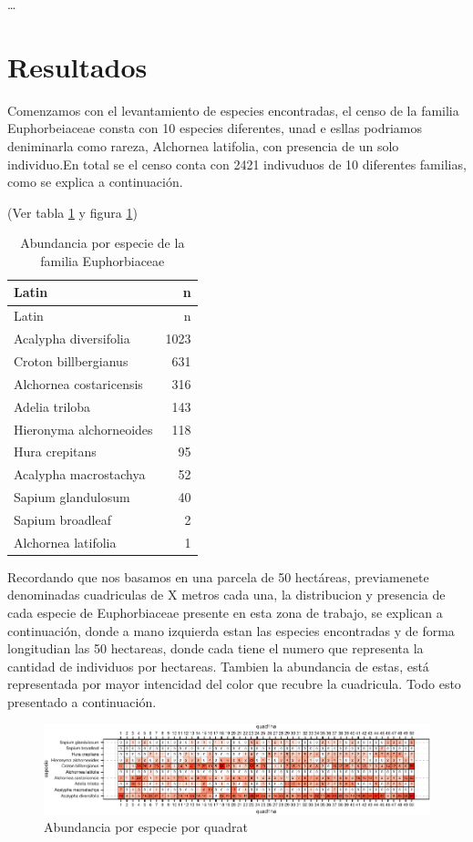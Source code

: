 \documentclass[11pt,]{article}
\begin{document}
\ldots

\section{Resultados}\label{resultados}

Comenzamos con el levantamiento de especies encontradas, el censo de la
familia Euphorbeiaceae consta con 10 especies diferentes, unad e esllas
podriamos deniminarla como rareza, Alchornea latifolia, con presencia de
un solo individuo.En total se el censo conta con 2421 indivuduos de 10
diferentes familias, como se explica a continuación.

(Ver tabla \ref{tab:tabla_de_abundancia} y figura \ref{fig:abun_sp_q})

\begin{longtable}[]{@{}lr@{}}
\caption{\label{tab:tabla_de_abundancia}Abundancia por especie de la
familia Euphorbiaceae}\tabularnewline
\toprule
Latin & n\tabularnewline
\midrule
\endfirsthead
\toprule
Latin & n\tabularnewline
\midrule
\endhead
Acalypha diversifolia & 1023\tabularnewline
Croton billbergianus & 631\tabularnewline
Alchornea costaricensis & 316\tabularnewline
Adelia triloba & 143\tabularnewline
Hieronyma alchorneoides & 118\tabularnewline
Hura crepitans & 95\tabularnewline
Acalypha macrostachya & 52\tabularnewline
Sapium glandulosum & 40\tabularnewline
Sapium broadleaf & 2\tabularnewline
Alchornea latifolia & 1\tabularnewline
\bottomrule
\end{longtable}

Recordando que nos basamos en una parcela de 50 hectáreas, previamenete
denominadas cuadriculas de X metros cada una, la distribucion y
presencia de cada especie de Euphorbiaceae presente en esta zona de
trabajo, se explican a continuación, donde a mano izquierda estan las
especies encontradas y de forma longitudian las 50 hectareas, donde cada
tiene el numero que representa la cantidad de individuos por hectareas.
Tambien la abundancia de estas, está representada por mayor intencidad
del color que recubre la cuadricula. Todo esto presentado a
continuación.

\begin{figure}
\centering
\includegraphics{manuscrito_files/figure-latex/unnamed-chunk-3-1.pdf}
\caption{\label{fig:abun_sp_q}Abundancia por especie por quadrat}
\end{figure}
\end{document}
